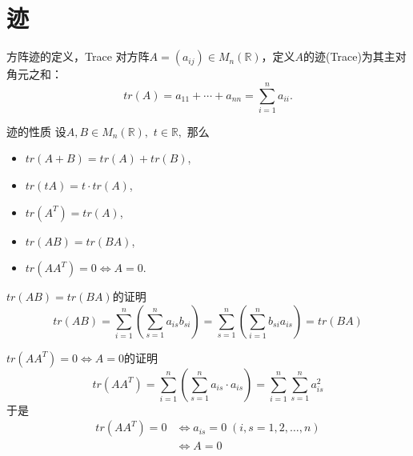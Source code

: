 
\section{迹}


\begin{frame}

\begin{block}{方阵迹的定义，Trace}
对方阵$A = (a_{ij}) \in M_n(\mathbb{R})$，定义$A$的迹(Trace)为其主对角元之和：
$$tr(A) = a_{11} + \cdots + a_{nn} = \sum\limits_{i=1}^n a_{ii}.$$
\end{block}

\pause

\begin{block}{迹的性质}
设$A,B\in M_n(\mathbb{R}),$ $t\in \mathbb{R},$ 那么
\begin{itemize}
\item $tr(A+B) = tr(A) + tr(B)$,
\item $tr(tA) = t\cdot tr(A)$,
\item $tr(A^T) = tr(A)$,
\item $tr(AB) = tr(BA)$,
\item $tr(AA^T) = 0 \Longleftrightarrow A = 0$.
\end{itemize}
\end{block}

\end{frame}


\begin{frame}

\begin{block}{$tr(AB) = tr(BA)$的证明}
$$tr(AB) = \sum\limits_{i=1}^n \left( \sum\limits_{s=1}^n a_{is}b_{si} \right) = \sum\limits_{s=1}^n \left( \sum\limits_{i=1}^n b_{si}a_{is} \right) = tr(BA)$$
\end{block}

\pause

\begin{block}{$tr(AA^T) = 0 \Longleftrightarrow A = 0$的证明}
$$tr(AA^T) = \sum\limits_{i=1}^n \left( \sum\limits_{s=1}^n a_{is}\cdot a_{is} \right) = \sum\limits_{i=1}^n \sum\limits_{s=1}^n a^2_{is}$$
于是
\begin{align*}
tr(AA^T) = 0 & \Longleftrightarrow a_{is} = 0 \; (i,s = 1,2,\ldots,n) \\
 & \Longleftrightarrow A = 0
\end{align*}
\end{block}

\end{frame}

